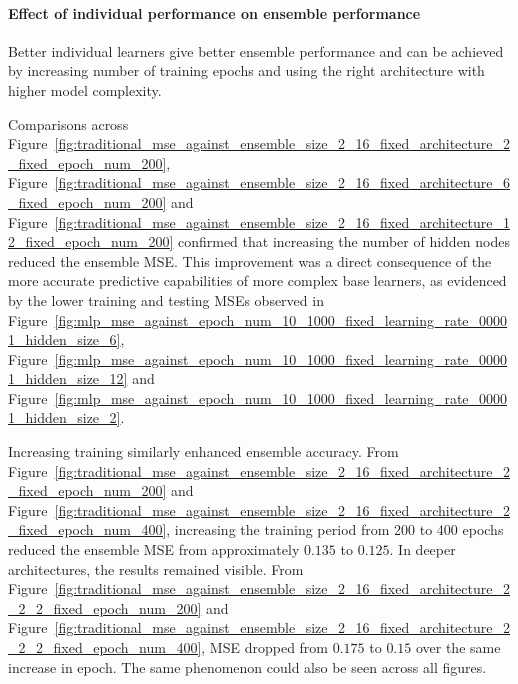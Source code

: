\paragraph{Effect of individual performance on ensemble performance}
Better individual learners give better ensemble performance and can be achieved by increasing number of training epochs and using the right architecture with higher model complexity. 

Comparisons across Figure~\ref{fig:traditional_mse_against_ensemble_size_2_16_fixed_architecture_2_fixed_epoch_num_200}, Figure~\ref{fig:traditional_mse_against_ensemble_size_2_16_fixed_architecture_6_fixed_epoch_num_200} and Figure~\ref{fig:traditional_mse_against_ensemble_size_2_16_fixed_architecture_12_fixed_epoch_num_200} confirmed that increasing the number of hidden nodes reduced the ensemble MSE. This improvement was a direct consequence of the more accurate predictive capabilities of more complex base learners, as evidenced by the lower training and testing MSEs observed in Figure~\ref{fig:mlp_mse_against_epoch_num_10_1000_fixed_learning_rate_00001_hidden_size_6}, Figure~\ref{fig:mlp_mse_against_epoch_num_10_1000_fixed_learning_rate_00001_hidden_size_12} and Figure~\ref{fig:mlp_mse_against_epoch_num_10_1000_fixed_learning_rate_00001_hidden_size_2}. 

Increasing training similarly enhanced ensemble accuracy. From Figure~\ref{fig:traditional_mse_against_ensemble_size_2_16_fixed_architecture_2_fixed_epoch_num_200} and Figure~\ref{fig:traditional_mse_against_ensemble_size_2_16_fixed_architecture_2_fixed_epoch_num_400}, increasing the training period from 200 to 400 epochs reduced the ensemble MSE from approximately $0.135$ to $0.125$. In deeper architectures, the results remained visible. From Figure~\ref{fig:traditional_mse_against_ensemble_size_2_16_fixed_architecture_2_2_2_fixed_epoch_num_200} and Figure~\ref{fig:traditional_mse_against_ensemble_size_2_16_fixed_architecture_2_2_2_fixed_epoch_num_400}, MSE dropped from $0.175$ to $0.15$ over the same increase in epoch. The same phenomenon could also be seen across all figures. 




